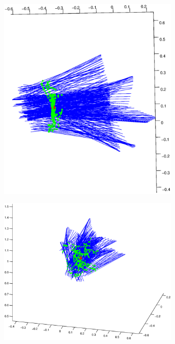 \documentclass{ut-thesis}
\begin{document}
\begin{figure}[h]
	\centering
	\begin{subfigure}[b]{0.49\textwidth}
		\includegraphics[width=1.1\linewidth]{./img/loc_calib_gauss.eps}
	\end{subfigure}
	\hfill
	\begin{subfigure}[b]{0.49\textwidth}
		\includegraphics[width=1.1\linewidth]{./img/loc_calib_gauss_cross.eps}

\end{subfigure}
\end{figure}
\end{document}

